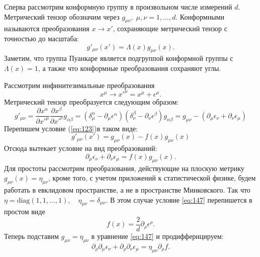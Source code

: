 \documentclass[a4paper,12pt]{article}
\theoremstyle{definition}
\theoremstyle{definition}
\theoremstyle{definition}
\begin{document}
Сперва рассмотрим конформную группу в произвольном числе измерений $d$. Метрический тензор обозначим
через $g_{\mu\nu},\; \mu,\nu=1,\dots,d$. Конформными называются преобразования $x\to x'$,
сохраняющие метрический тензор с точностью до масштаба: 
\begin{equation}
  \label{eq:123}
  g'_{\mu\nu}(x')=\Lambda(x) g_{\mu\nu}(x).
\end{equation}
Заметим, что группа Пуанкаре является подгруппой конформной группы с $\Lambda(x)=1$, а также что
конформные преобразования сохраняют углы.  

Рассмотрим инфинитезимальные преобразования
\begin{equation}
  \label{eq:144}
  x^{\mu}\to x'^{\mu}=x^{\mu}+\epsilon^{\mu}.
\end{equation}
Метрический тензор преобразуется следующим образом:
\begin{equation}
  \label{eq:145}
  g'_{\mu\nu}=\frac{\partial x^{\alpha}}{\partial x'^{\mu}}\frac{\partial x^{\beta}}{\partial
    x'^{\nu}}
  g_{\alpha\beta}=(\delta^{\alpha}_{\mu}-\partial_{\mu}\epsilon^{\alpha})(\delta^{\beta}_{\nu}-\partial_{\nu}
  \epsilon^{\beta})g_{\alpha\beta}=g_{\mu\nu}-(\partial_{\mu}\epsilon_{\nu}+\partial_{\nu}\epsilon_{\mu}) 
\end{equation}
Перепишем условие (\ref{eq:123})в таком виде:
\begin{equation}
  \label{eq:146}
  g'_{\mu\nu}(x')=g_{\mu\nu}(x)-f(x)g_{\mu\nu}(x)
\end{equation}
Отсюда вытекает условие на вид преобразований:
\begin{equation}
  \label{eq:147}
  \partial_{\mu}\epsilon_{\nu}+\partial_{\nu}\epsilon_{\mu}=f(x)g_{\mu\nu}(x).
\end{equation}
Для простоты рассмотрим преобразования, действующие на плоскую метрику
$g_{\mu\nu}(x)=\eta_{\mu\nu}$, кроме того, с учетом приложений к статистической физике, будем
работать в евклидовом пространстве, а не в пространстве Минковского. Так что
$\eta=\mathrm{diag}(1,1,\dots,1),\quad \eta_{\mu\nu}=\delta_{\mu\nu}$. В этом случае условие
\eqref{eq:147} перепишется в простом виде 
\begin{equation}
  \label{eq:148}
  f(x)=\frac{2}{d}\partial_{\rho}\epsilon^{\rho}.
\end{equation}
Теперь подставим $g_{\mu\nu}=\eta_{\mu\nu}$ в уравнение \eqref{eq:147} и продиффернцируем:
\begin{equation}
  \label{eq:149}
  \partial_{\rho} \partial_{\mu}\epsilon_{\nu}+\partial_{\rho}\partial_{\nu}\epsilon_{\mu}=\eta_{\mu\nu}\partial_{\rho} f.
\end{equation}
\end{document}
